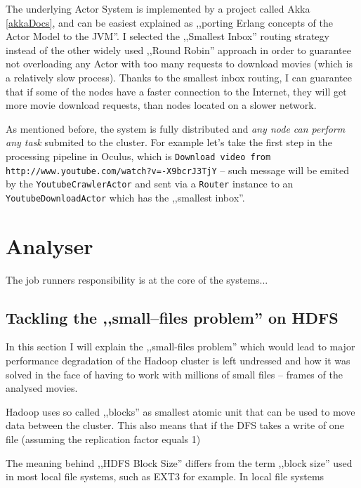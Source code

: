 The underlying Actor System is implemented by a project called Akka \ref{akkaDocs}, and can be easiest explained as ,,porting Erlang concepts of the Actor Model to the JVM''. I selected the ,,Smallest Inbox'' routing strategy instead of the other widely used ,,Round Robin'' approach in order to guarantee not overloading any Actor with too many requests to download movies (which is a relatively slow process). Thanks to the smallest inbox routing, I can guarantee that if some of the nodes have a faster connection to the Internet, they will get more movie download requests, than nodes located on a slower network.

As mentioned before, the system is fully distributed and \textit{any node can perform any task} submited to the cluster. For example let's take the first step in the processing pipeline in Oculus, which is \verb|Download video from http://www.youtube.com/watch?v=-X9bcrJ3TjY| -- such message will be emited by the \verb|YoutubeCrawlerActor| and sent via a \verb|Router| instance to an \verb|YoutubeDownloadActor| which has the ,,smallest inbox''.


\section{Analyser}
The job runners responsibility is at the core of the systems... 

\subsection{Tackling the ,,small--files problem'' on HDFS}
In this section I will explain the ,,small-files problem'' which would lead to major performance degradation of the Hadoop cluster is left undressed and how it was solved
in the face of having to work with millions of small files -- frames of the analysed movies.

Hadoop uses so called ,,blocks'' as smallest atomic unit that can be used to move data between the cluster.
This also means that if the DFS takes a write of one file (assuming the replication factor equals 1)

The meaning behind ,,HDFS Block Size'' differs from the term ,,block size'' used in most local file systems, such as EXT3 for example.
In local file systems

